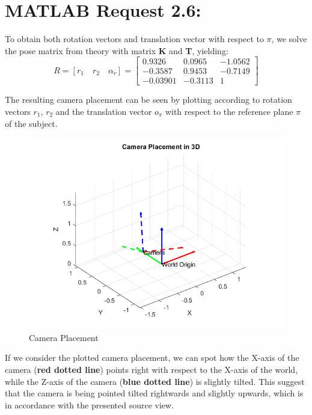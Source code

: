 \documentclass{Configuration_Files/PoliMi3i_thesis}
\begin{document}
\section{MATLAB Request 2.6: }
To obtain both rotation vectors and translation vector with respect to $\pi$, we solve the pose matrix from theory with matrix \textbf{K} and \textbf{T}, yielding:
\[
R = \left[ r_1 \quad r_2 \quad \alpha_r \right] = 
\begin{bmatrix}
0.9326 & 0.0965 & -1.0562 \\
-0.3587 & 0.9453 & -0.7149 \\
-0.03901 & -0.3113 & 1
\end{bmatrix}
\]

The resulting camera placement can be seen by plotting according to rotation vectors \(r_{1}\), \(r_{2}\) and the translation vector \(o_{\pi}\) with respect to the reference plane \(\pi\) of the subject.
\begin{figure}[H]
    \centering
    \includegraphics[width=0.5\linewidth]{Project Template/Images/cam.png}
    \caption{Camera Placement}
    \label{fig:enter-label}
\end{figure}
If we consider the plotted camera placement, we can spot how the X-axis of the camera (\textbf{red dotted line}) points right with respect to the X-axis of the world, while the Z-axis of the camera (\textbf{blue dotted line}) is slightly tilted. This suggest that the camera is being pointed tilted rightwards and slightly upwards, which is in accordance with the presented source view.

\newpage
\end{document}

